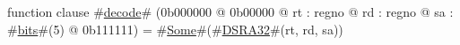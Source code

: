 function clause #\hyperref[zdecode]{decode}# (0b000000 @ 0b00000 @ rt : regno @ rd : regno @ sa : #\hyperref[zbits]{bits}#(5) @ 0b111111) =
  #\hyperref[zSome]{Some}#(#\hyperref[zDSRAthreetwo]{DSRA32}#(rt, rd, sa))

